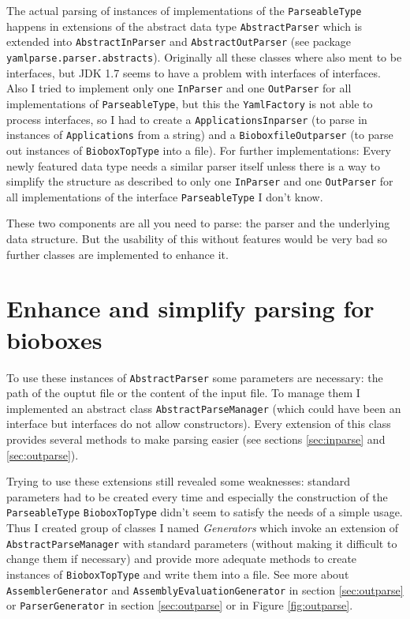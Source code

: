\documentclass[
	twoside,
	fontsize=12pt,
	headsepline,
	cleardoublepage=empty,
	numbers=noenddot,
	bibliography=totoc,
]{scrbook}
\newcommand{\code}[1]{\texttt{#1}}
\begin{document}
The actual parsing of instances of implementations of the \code{ParseableType} happens in extensions of the abstract data type \code{AbstractParser} which is extended into \code{AbstractInParser} and \code{AbstractOutParser} (see package \\ \code{yamlparse.parser.abstracts}). Originally all these classes where also ment to be interfaces, but JDK 1.7 seems to have a problem with interfaces of interfaces. Also I tried to implement only one \code{InParser} and one \code{OutParser} for all implementations of \code{ParseableType}, but this the \code{YamlFactory} is not able to process interfaces, so I had to create a \code{ApplicationsInparser} (to parse in instances of \code{Applications} from a string) and a \code{BioboxfileOutparser} (to parse out instances of \code{BioboxTopType} into a file). For further implementations: Every newly featured data type needs a similar parser itself unless there is a way to simplify the structure as described to only one \code{InParser} and one \code{OutParser} for all implementations of the interface \code{ParseableType} I don't know. 

These two components are all you need to parse: the parser and the underlying data structure. But the usability of this without features would be very bad so further classes are implemented to enhance it. 

\section{Enhance and simplify parsing for bioboxes}

To use these instances of \code{AbstractParser} some parameters are necessary: the path of the ouptut file or the content of the input file. To manage them I implemented an abstract class \code{AbstractParseManager} (which could have been an interface but interfaces do not allow constructors). Every extension of this class provides several methods to make parsing easier (see sections \ref{sec:inparse} and \ref{sec:outparse}). 

Trying to use these extensions still revealed some weaknesses: standard parameters had to be created every time and especially the construction of the \code{ParseableType} \code{BioboxTopType} didn't seem  to satisfy the needs of a simple usage. Thus I created group of classes I named \emph{Generators} which invoke an extension of \\ \code{AbstractParseManager} with standard parameters (without making it difficult to change them if necessary) and provide more adequate methods to create instances of \code{BioboxTopType} and write them into a file. See more about \code{AssemblerGenerator} and \code{AssemblyEvaluationGenerator} in section \ref{sec:outparse} or \code{ParserGenerator} in section \ref{sec:outparse} or in Figure \ref{fig:outparse}.
\end{document}
